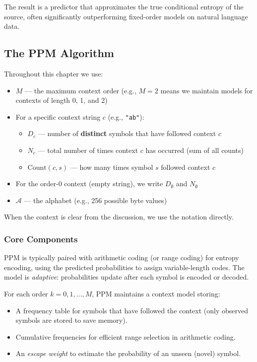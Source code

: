The result is a predictor that approximates the true conditional entropy of the
source, often significantly outperforming fixed-order models on natural language
data.

\subsection{The PPM Algorithm}

\begin{definitionbox}[Notation]
Throughout this chapter we use:
\begin{itemize}
    \item $M$ — the maximum context order (e.g., $M=2$ means we maintain models for 
          contexts of length 0, 1, and 2)
    \item For a specific context string $c$ (e.g., \texttt{"ab"}):
        \begin{itemize}
            \item $D_c$ — number of \textbf{distinct} symbols that have followed context $c$
            \item $N_c$ — total number of times context $c$ has occurred (sum of all counts)
            \item $\text{Count}(c,s)$ — how many times symbol $s$ followed context $c$
        \end{itemize}
    \item For the order-0 context (empty string), we write $D_{\emptyset}$ and $N_{\emptyset}$
    \item $\mathcal{A}$ — the alphabet (e.g., 256 possible byte values)
\end{itemize}
When the context is clear from the discussion, we use the notation directly.
\end{definitionbox}

\subsubsection{Core Components}

PPM is typically paired with arithmetic coding (or range coding) for entropy
encoding, using the predicted probabilities to assign variable-length codes. The
model is \emph{adaptive}: probabilities update after each symbol is encoded or
decoded.

For each order $k = 0, 1, \ldots, M$, PPM maintains a context model storing:
\begin{itemize}
    \item A frequency table for symbols that have followed the context (only observed
          symbols are stored to save memory).
    \item Cumulative frequencies for efficient range selection in arithmetic coding.
    \item An \textit{escape weight} to estimate the probability of an unseen (novel)
          symbol.
\end{itemize}

